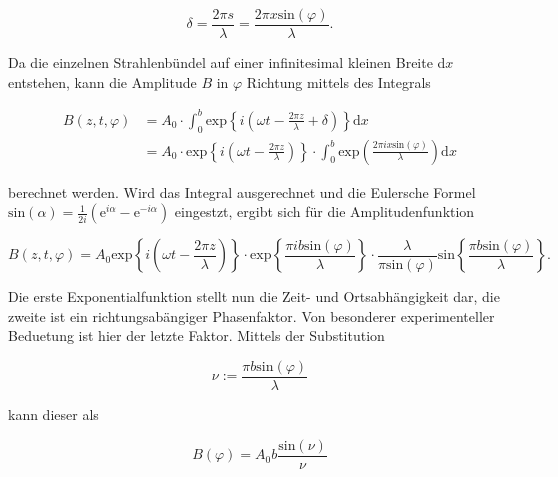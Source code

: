         \begin{equation*}
            \delta = \frac{2 \pi s}{\lambda} = \frac{2 \pi x \text{sin}(\varphi)}{\lambda}.
        \end{equation*}

        \noindent Da die einzelnen Strahlenbündel auf einer infinitesimal kleinen Breite d$x$ entstehen, kann die Amplitude $B$ in 
        $\varphi$ Richtung mittels des Integrals 
        
        \begin{align*}
            B(z,t,\varphi) &= A_0 \cdot \int_0^b \text{exp}\left\{ i \left( \omega t - \frac{2 \pi z}{\lambda} + \delta \right) \right\} \text{d}x \\
                           &= A_0 \cdot \text{exp}\left\{ i \left( \omega t - \frac{2 \pi z}{\lambda} \right) \right\} \cdot \int_0^b 
                           \text{exp}\left( \frac{2 \pi i x \text{sin} (\varphi)}{\lambda }\right) \text{d}x
        \end{align*}

        \noindent berechnet werden. Wird das Integral ausgerechnet und die Eulersche Formel $\text{sin}(\alpha) = \frac{1}{2i}\left( 
        \text{e}^{i \alpha} - \text{e}^{-i \alpha} \right)$ eingestzt, ergibt sich für die Amplitudenfunktion

        \begin{equation}
            B(z,t,\varphi) = A_0 \text{exp}\left\{ i \left( \omega t - \frac{2 \pi z}{\lambda} \right) \right\} \cdot
            \text{exp}\left\{ \frac{\pi i b \text{sin}(\varphi)}{\lambda} \right\} \cdot \frac{\lambda}{\pi\text{sin}(\varphi)}
            \text{sin}\left\{ \frac{\pi b \text{sin}(\varphi)}{\lambda} \right\}.
            \label{eqn:beug}
        \end{equation}

        \noindent Die erste Exponentialfunktion stellt nun die Zeit- und Ortsabhängigkeit dar, die zweite ist ein richtungsabängiger 
        Phasenfaktor. Von besonderer experimenteller Beduetung ist hier der letzte Faktor. Mittels der Substitution 

        \begin{equation*}
            \nu := \frac{\pi b \text{sin}(\varphi)}{\lambda}
        \end{equation*}
        
        \noindent kann dieser als 

        \begin{equation*}
            B(\varphi) = A_0 b \frac{\text{sin}(\nu)}{\nu}
        \end{equation*}


